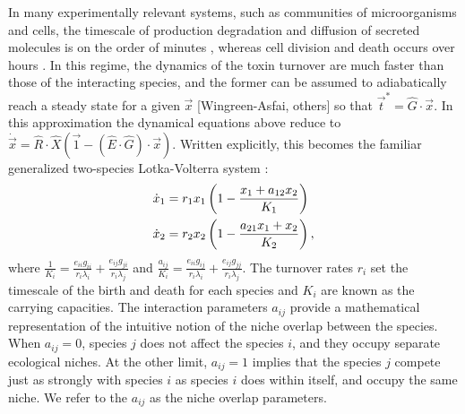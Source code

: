 \documentclass[a4paper,11pt]{article}
\numberwithin{equation}{section} %
\begin{document}
In many experimentally relevant systems, such as communities of microorganisms and cells, the timescale of production degradation and diffusion of secreted molecules is on the order of minutes \cite{??}, whereas cell division and death occurs over hours \cite{??}. In this regime, the dynamics of the toxin turnover are much faster than those of the interacting species, and the former can be assumed to adiabatically reach a steady state for a given $\vec{x}$ \cite{adiabatic}[Wingreen-Asfai, others] so that $\vec{t}^* = \hat{G}\cdot \vec{x}$.
In this approximation the dynamical equations above reduce to $ \dot{\vec{x}} = \hat{R}\cdot\hat{X} \left( \vec{1} - (\hat{E}\cdot\hat{G})\cdot\vec{x} \right)$. 
Written explicitly, this becomes the familiar generalized two-species Lotka-Volterra system \cite{Chotibut2015,MacArthur1970,Dobrinevski2012,Constable2015,Bomze1983,Levin1970,Czuppon2017}:
\begin{align}
\dot{x}_1 &= r_1 x_1 \left( 1 - \frac{x_1 + a_{12} x_2}{K_1} \right) \notag \\
\dot{x}_2 &= r_2 x_2 \left( 1 - \frac{a_{21} x_1 + x_2}{K_2} \right), \label{mean-field-eqns}
\end{align}
where $\frac{1}{K_i} = \frac{e_{ii} g_{ii}}{r_i \lambda_i} + \frac{e_{ij} g_{ji}}{r_i \lambda_j}$ and $\frac{a_{ij}}{K_i} = \frac{e_{ii} g_{ij}}{r_i \lambda_i} + \frac{e_{ij} g_{jj}}{r_i \lambda_j}$. %
The turnover rates $r_i$ set the timescale of the birth and death for each species and $K_i$ are known as the carrying capacities. The interaction parameters $a_{ij}$  provide a mathematical representation of the intuitive notion of the niche overlap between the species. When $a_{ij}=0$, species $j$ does not affect the species $i$, and they occupy separate ecological niches. At the other limit, $a_{ij}=1$ implies that the species $j$ compete just as strongly with species $i$ as species $i$ does within itself, and occupy the same niche. We refer to the $a_{ij}$ as the niche overlap parameters. 
\end{document}
